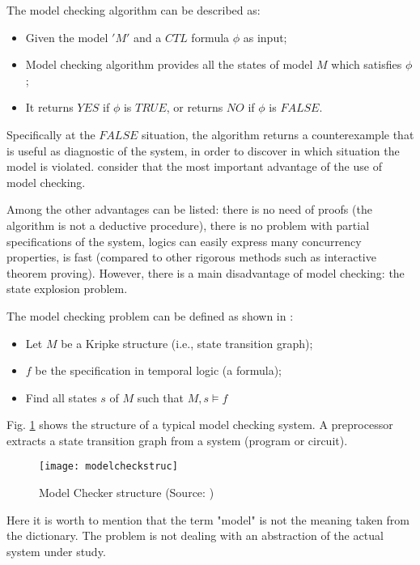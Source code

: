 The model checking algorithm can be described as:  

\begin{itemize}
\item Given the model $ 'M' $ and a $CTL$ formula $ \phi $ as input;  
\item Model checking algorithm provides all the states of model $ M $ which satisfies $ \phi $;  
\item It returns $YES$ if $ \phi $ is $TRUE$, or returns $NO$ if $ \phi $ is $FALSE$.  

\end{itemize}
Specifically at the $FALSE$ situation, the algorithm returns a counterexample that is useful as diagnostic of the system, in order to discover in which situation the model is violated. \cite{Clarke2008} consider that the most important advantage of the use of model checking.  
 
Among the other advantages can be listed: there is no need of proofs (the algorithm is not a deductive procedure), there is no problem with partial specifications of the system, logics can easily express many concurrency properties, is fast (compared to other rigorous methods such as interactive theorem proving). However, there is a main disadvantage of model checking: the state explosion problem. 

The model checking problem can be defined as shown in \cite{Clarke2008}: 

\begin{itemize}
\item Let $M$ be a Kripke structure (i.e., state transition graph);
\item $f$ be the specification in temporal logic (a formula);
\item Find all states $s$ of $M$ such that $M , s \models f$
\end{itemize}

Fig. \ref{fig:modelcheckstruc} shows the structure of a typical model checking system. A preprocessor extracts a state transition graph from a system (program or circuit).

\begin{figure}[h]
\texttt{[image: modelcheckstruc]}
\centering
\caption{Model Checker structure (Source: \cite{Clarke2008})}
\label{fig:modelcheckstruc}
\end{figure}

Here it is worth to mention that the term "model" is not the meaning taken from the dictionary. The problem is not dealing with an abstraction of the actual system under study. 

